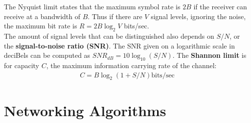 The Nyquist limit states that the maximum symbol rate is $2B$ if the receiver can receive at a bandwidth of $B$. Thus if there are $V$ signal levels, ignoring the noise, the maximum bit rate is $R = 2B \log_2 V$ bits/sec.\vspace{.3cm}\\

The amount of signal levels that can be distinguished also depends on $S/N$, or the \textbf{signal-to-noise ratio (SNR)}. The SNR given on a logarithmic scale in deciBels can be computed as $SNR_{dB} = 10 \log_{10}(S/N)$. The \textbf{Shannon limit} is for capacity $C$, the maximum information carrying rate of the channel:
\begin{align*}
C = B \log_2(1 + S/N) \text{bits/sec}
\end{align*}

\section{Networking Algorithms}

